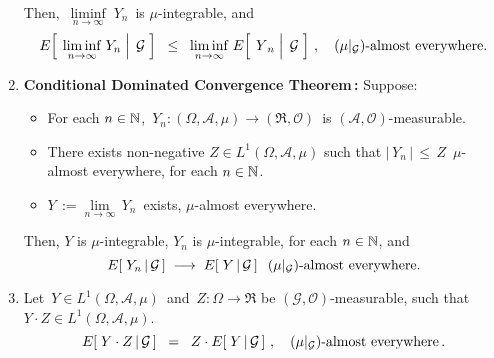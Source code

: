 \begin{theorem}
\begin{enumerate}
	Then,
	\,$\underset{n\rightarrow\infty}{\liminf}\;Y_{n}$\, is $\mu$-integrable, and
	\begin{equation*}
	E\!\left[\;\left.\underset{n\rightarrow\infty}{\liminf}\;Y_{n}\;\right\vert\;\mathcal{G}\;\right]
	\;\;\leq\;\;
	\underset{n\rightarrow\infty}{\liminf}\; E\!\left[\;\left.\overset{{\color{white}.}}{Y}_{n}\;\right\vert\;\mathcal{G}\;\right]\,,
	\quad
	\textnormal{$(\mu\vert_{\mathcal{G}})$-almost everywhere}.
	\end{equation*}
\item\label{ConditionalDominatedConvergence}
	\textbf{Conditional Dominated Convergence Theorem\,:}
	\vskip 0.0cm
	Suppose:
	\begin{itemize}
	\item
		For each $n\in\mathbb{N}$,
		\,$Y_{n} : (\Omega,\mathcal{A},\mu)\longrightarrow(\Re,\mathcal{O})$\,
		is $(\mathcal{A},\mathcal{O})$-measurable.
	\item
		There exists non-negative $Z \in L^{1}(\Omega,\mathcal{A},\mu)$ such that
		$\vert \, Y_{n} \, \vert \,\leq\, Z$\, $\mu$-almost everywhere, for each $n\in\mathbb{N}$.
	\item
		$Y \,:= \underset{n\rightarrow\infty}{\lim}\,Y_{n}$\, exists, $\mu$-almost everywhere.
	\end{itemize}
	Then, $Y$ is $\mu$-integrable, $Y_{n}$ is $\mu$-integrable, for each $n\in\mathbb{N}$, and
	\begin{equation*}
	E\!\left[\;Y_{n}\,\vert\,\mathcal{G}\,\right]
	\;\longrightarrow\;
	E\!\left[\;Y\,\vert\,\mathcal{G}\,\right]
	\;\;\textnormal{$(\mu\vert_{\mathcal{G}})$-almost everywhere}.
	\end{equation*}
\item\label{FactorOutWhatIsKnown}
	Let \,$Y \in L^{1}(\Omega,\mathcal{A},\mu)$\, and \,$Z : \Omega \longrightarrow \Re$ be
	$(\mathcal{G},\mathcal{O})$-measurable, such that
	\,$Y \cdot Z \in L^{1}(\Omega,\mathcal{A},\mu)$.
	\begin{equation*}
	E\!\left[\;Y \cdot Z\,\vert\,\mathcal{G}\,\right]
	\;\; = \;\;
	Z \cdot E\!\left[\;Y\,\vert\,\mathcal{G}\,\right]\,,
	\quad
	\textnormal{$(\mu\vert_{\mathcal{G}})$-almost everywhere}\,.
	\end{equation*}
\end{enumerate}
\end{theorem}

\proof

